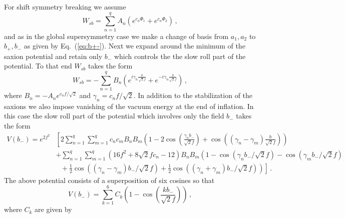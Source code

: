 \documentclass[12pt]{article}
\begin{document}
For shift symmetry breaking we assume
\begin{equation}
  W_{sb} = \sum_{n = 1}^q A_n \left(e^{c_n \Phi_1} + e^{c_n \Phi_2}\right)\,,
\end{equation}
and as in the global supersymmetry case we make a change of basis from $a_1, a_2$ to $b_+, b_-$ as given by Eq.~(\ref{eq:b+-}).
Next we expand around the minimum of the saxion potential and retain only $b_-$ which controls the the slow roll part of the potential.
To that end $W_{sb}$ takes the form
\begin{equation}
  W_{sb} = -\sum_{n = 1}^q B_n \left(
      e^{i \gamma_n \frac{b}{\sqrt{2} f}}
    + e^{-i \gamma_n \frac{b}{\sqrt{2} f}}
  \right)\,,
\end{equation}
where $B_n = -A_n e^{c_n f / \sqrt{2}}$ and $\gamma_n = c_n f / \sqrt{2}$.
In addition to the stabilization of the saxions we also impose vanishing of the vacuum energy at the end of inflation.
In this case the slow roll part of the potential which involves only the field $b_-$ takes the form
\begin{equation} \label{eq:supergravity:Vslow}
  \begin{aligned}
    V\left(b_-\right) = e^{2 f^2} &\left[
      2 \sum_{n = 1}^q \sum_{m = 1}^q c_n c_m B_n B_m \left(
          1
        - 2 \cos\left(\frac{\gamma_n b_-}{\sqrt{2} f}\right)
        + \cos\left(\left(\gamma_n - \gamma_m\right) \frac{b}{\sqrt{2} f}\right)
      \right)\right.\\
      & + \sum_{n = 1}^q \sum_{m = 1}^q \left(16 f^2 + 8 \sqrt{2} f c_n - 12\right) B_n B_m \left(
          1
        - \cos\left(\gamma_n b_- / \sqrt{2} f\right)
        - \cos\left(\gamma_m b_- / \sqrt{2} f\right)\right.\\
      & ~~~ \left.\left.{}
        + \frac{1}{2} \cos\left(\left(\gamma_n - \gamma_m\right) b_- / \sqrt{2} f\right)
        + \frac{1}{2} \cos\left(\left(\gamma_n + \gamma_m\right) b_- / \sqrt{2} f\right)
      \right)
    \right]\,.
  \end{aligned}
\end{equation}
The above potential consists of a superposition of six cosines so that
\begin{equation} \label{eq:supergravity:Vslow3}
  V\left(b_-\right)
    = \sum_{k = 1}^6 C_k \left(1 - \cos\left(\frac{k b_-}{\sqrt{2} f}\right)\right)\,,
\end{equation}
where $C_k$ are given by
\end{document}
